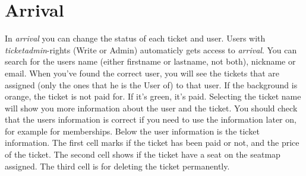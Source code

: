 
\section{Arrival}
In \textit{arrival} you can change the status of each ticket and user. Users with \textit{ticketadmin}-rights (Write or Admin) automaticly gets access to \textit{arrival}.
You can search for the users name (either firstname or lastname, not both), nickname or email. When you've found the correct user, you will see the tickets that are assigned (only the ones that he is the User of) to that user. If the background is orange, the ticket is not paid for. If it's green, it's paid.
Selecting the ticket name will show you more information about the user and the ticket. You should check that the users information is correct if you need to use the information later on, for example for memberships.
Below the user information is the ticket information. The first cell marks if the ticket has been paid or not, and the price of the ticket.
The second cell shows if the ticket have a seat on the seatmap assigned. The third cell is for deleting the ticket permanently.
